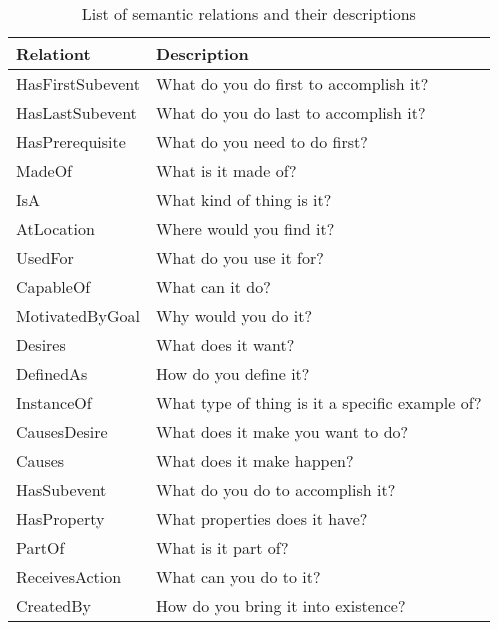 \clearpage
\begin{table}[ph!]   %
	\centering
	\caption{List of semantic relations and their descriptions} \vspace{0.25em}
	\begin{tabular}{|p{1.5in}|p{2in}|} \hline
		\centering Relationt & Description\\ \hline
		HasFirstSubevent & What do you do first to accomplish it? \\ \hline
		HasLastSubevent & What do you do last to accomplish it? \\ \hline
		HasPrerequisite & What do you need to do first? \\ \hline
		MadeOf & What is it made of? \\ \hline
		IsA & What kind of thing is it? \\ \hline
		AtLocation & Where would you find it? \\ \hline
		UsedFor & What do you use it for? \\ \hline
		CapableOf & What can it do? \\ \hline
		MotivatedByGoal & Why would you do it? \\ \hline
		Desires & What does it want? \\ \hline
		DefinedAs & How do you define it? \\ \hline
		InstanceOf & What type of thing is it a specific example of? \\ \hline
		CausesDesire & What does it make you want to do? \\ \hline
		Causes & What does it make happen? \\ \hline
		HasSubevent & What do you do to accomplish it? \\ \hline
		HasProperty & What properties does it have? \\ \hline
		PartOf & What is it part of? \\ \hline
		ReceivesAction & What can you do to it? \\ \hline
		CreatedBy & How do you bring it into existence? \\ \hline
	\end{tabular}
	\label{tab:SemanticsDescription}
\end{table}
\clearpage
